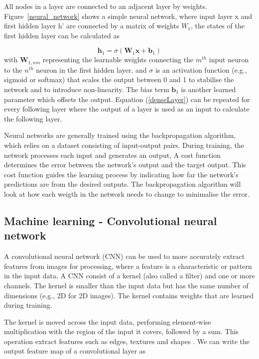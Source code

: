\documentclass{article}
\begin{document}
All nodes in a layer are connected to an adjacent layer by weights. Figure~\ref{neural_network} shows a simple neural network, where input layer x and first hidden layer h' are connected by a matrix of weights $W_1$, the states of the first hidden layer can be calculated as

\begin{equation}
\label{denseLayer}
\mathbf{h}_1 = \sigma(\mathbf{W}_1 \mathbf{x} + \mathbf{b}_1)
\end{equation}
with $\mathbf{W}_{1,nm}$ representing the learnable weights connecting the $m^{th}$ input neuron to the $n^{th}$ neuron in the first hidden layer, and $\sigma$ is an activation function (e.g., sigmoid or softmax) that scales the output between 0 and 1 to stabilise the network and to introduce non-linearity. The bias term $\mathbf{b}_1$ is another learned parameter which offsets the output. Equation (\ref{denseLayer}) can be repeated for every following layer where the output of a layer is used as an input to calculate the following layer.

Neural networks are generally trained using the backpropagation algorithm, which relies on a dataset consisting of input-output pairs. During training, the network processes each input and generates an output, A cost function determines the error between the network's output and the target output. This cost function guides the learning process by indicating how far the network's predictions are from the desired outputs. The backpropagation algorithm will look at how each weigth in the network needs to change to minimalise the error.

\subsection{Machine learning - Convolutional neural network}

A convolutional neural network (CNN) can be used to more accurately extract features from images for processing, where a feature is a characteristic or pattern in the input data. A CNN consist of a kernel (also called a filter) and one or more channels. The kernel is smaller than the input data but has the same number of dimensions (e.g., 2D for 2D images). The kernel contains weights that are learned during training.

The kernel is moved across the input data, performing element-wise multiplication with the region of the input it covers, followed by a sum. This operation extract features such as edges, textures and shapes \citep{yamashita2018convolutional}. We can write the output feature map of a convolutional layer as
\end{document}
